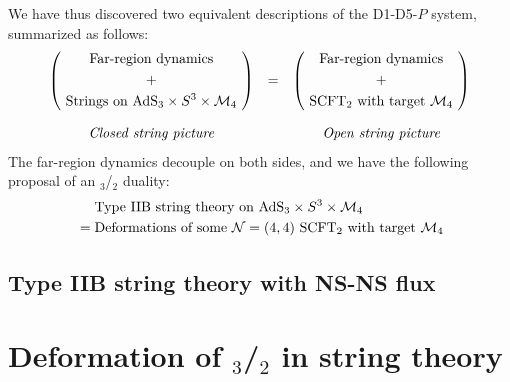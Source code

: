 \documentclass[11pt,a4paper]{article}
\newcommand{\ads}[1]{\text{AdS}\ensuremath{_{#1}}}
\newcommand{\cft}[1]{\text{CFT}\ensuremath{_{#1}}}
\begin{document}
	We have thus discovered two equivalent descriptions of the D1-D5-$P$ system, summarized as follows:
	\begin{equation*}
	\begin{array}{ccc}
		\pqty{
			\ \begin{gathered}
				\text{Far-region dynamics} \\
				+ \\
				\text{Strings on $\ads{3}\times S^3\times \mcal{M}_4$}
			\end{gathered}\ %
		}
		&=&
		\pqty{
			\ \begin{gathered}
				\text{Far-region dynamics} \\
				+ \\
				\text{S\cft{2} with target $\mcal{M}_4$}
				\vphantom{S^3}
			\end{gathered}\ %
		}
	\\[6ex]
		\textit{Closed string picture}
		& &
		\textit{Open string picture}
	\end{array}
	\end{equation*}
	The far-region dynamics decouple on both sides, and we have the following proposal of an \ads{3}/\cft{2} duality:
	\begin{equation}
	\begin{aligned}
		&\text{Type IIB string theory on $\ads{3}\times S^3\times \mcal{M}_4$} \\
		{} = {}
		&\text{Deformations of some $\mcal{N} = (4,4)$ S\cft{2} with target $\mcal{M}_4$}
	\end{aligned}
	\end{equation}
	
	
	
	
\subsection{Type IIB string theory with NS-NS flux}
	
	
	
	
\section{Deformation of \ads{3}/\cft{2} in string theory}


\pagebreak
 

\end{document}
